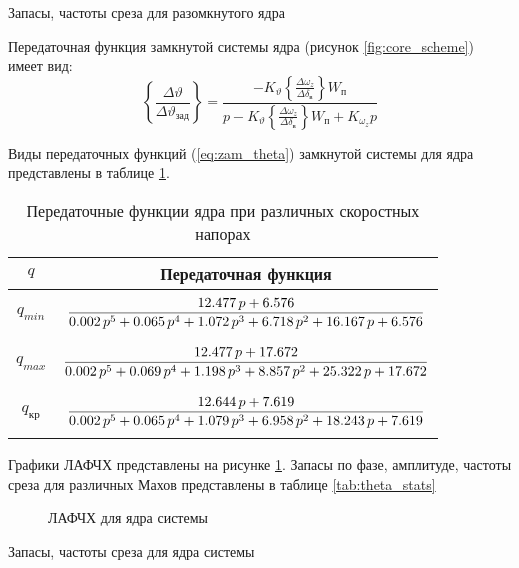 \begin{table}[H]
    \centering
    \caption{Запасы, частоты среза для разомкнутого ядра} 
    \label{tab:theta_ol_stats}
    
\end{table}


Передаточная функция замкнутой системы ядра (рисунок \ref{fig:core_scheme}) имеет вид:
\begin{equation}
    \left\{ \frac{\Delta \vartheta}{\Delta \vartheta_{зад}} \right\} = \frac{-K_{\vartheta}\left\{\frac{\Delta \omega_z}{\Delta \delta_\text{в}} \right\} W_п}{p - K_\vartheta \left\{\frac{\Delta \omega_z}{\Delta \delta_\text{в}} \right\} W_п + K_{\omega_z} p} 
    \label{eq:zam_theta}
\end{equation}

Виды передаточных функций (\ref{eq:zam_theta}) замкнутой системы для ядра представлены в таблице \ref{tab:core_tf}.

\begin{table}[H]
    \centering
    \caption{Передаточные функции ядра при различных скоростных напорах}
    \label{tab:core_tf}
    \begin{tabular}{|c|c|}
        \hline
    $q$ & Передаточная функция\\ 
    \hline
    $q_{min}$ & $\displaystyle \frac{12.477\,p+6.576}{0.002\,p^5+0.065\,p^4+1.072\,p^3+6.718\,p^2+16.167\,p+6.576}\addstrut{3em}$\\ 
    \hline
    $q_{max}$ & $\displaystyle \frac{12.477\,p+17.672}{0.002\,p^5+0.069\,p^4+1.198\,p^3+8.857\,p^2+25.322\,p+17.672}\addstrut{3em}$\\
    \hline
    $q_{кр}$ & $\displaystyle \frac{12.644\,p+7.619}{0.002\,p^5+0.065\,p^4+1.079\,p^3+6.958\,p^2+18.243\,p+7.619}\addstrut{3em}$ \\
    \hline
    \end{tabular}
\end{table}

Графики ЛАФЧХ представлены на рисунке \ref{fig:theta}. Запасы по фазе, амплитуде, частоты среза для различных Махов представлены в таблице \ref{tab:theta_stats}
\begin{figure}[H]
    \centering
    
    \caption{ЛАФЧХ для ядра системы}
    \label{fig:theta}
\end{figure}

\begin{table}[H]
    \centering
    \caption{Запасы, частоты среза для ядра системы}
    \label{tab:theta_stats}
    
\end{table}

